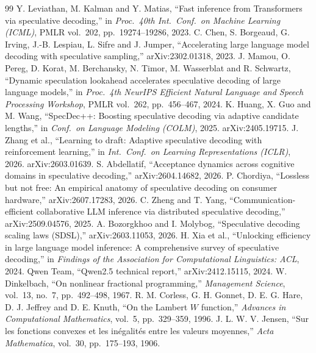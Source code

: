 \documentclass[10pt]{article}
\theoremstyle{remark}
\begin{document}
\small
\begin{thebibliography}{99}\setlength{\itemsep}{1pt}
 Y. Leviathan, M. Kalman and Y. Matias, ``Fast inference from Transformers via speculative
decoding,'' in \emph{Proc.\ 40th Int.\ Conf.\ on Machine Learning (ICML)}, PMLR vol.~202, pp.~19274--19286, 2023.
 C. Chen, S. Borgeaud, G. Irving, J.-B. Lespiau, L. Sifre and J. Jumper, ``Accelerating large
language model decoding with speculative sampling,'' arXiv:2302.01318, 2023.
 J. Mamou, O. Pereg, D. Korat, M. Berchansky, N. Timor, M. Wasserblat and R. Schwartz, ``Dynamic
speculation lookahead accelerates speculative decoding of large language models,'' in \emph{Proc.\ 4th NeurIPS
Efficient Natural Language and Speech Processing Workshop}, PMLR vol.~262, pp.~456--467, 2024.
 K. Huang, X. Guo and M. Wang, ``SpecDec++: Boosting speculative decoding via adaptive
candidate lengths,'' in \emph{Conf.\ on Language Modeling (COLM)}, 2025. arXiv:2405.19715.
 J. Zhang et al., ``Learning to draft: Adaptive speculative decoding with reinforcement
learning,'' in \emph{Int.\ Conf.\ on Learning Representations (ICLR)}, 2026. arXiv:2603.01639.
 S. Abdellatif, ``Acceptance dynamics across cognitive domains in speculative decoding,''
arXiv:2604.14682, 2026.
 P. Chordiya, ``Lossless but not free: An empirical anatomy of speculative decoding on consumer
hardware,'' arXiv:2607.17283, 2026.
 C. Zheng and T. Yang, ``Communication-efficient collaborative LLM inference via distributed
speculative decoding,'' arXiv:2509.04576, 2025.
 A. Bozorgkhoo and I. Molybog, ``Speculative decoding scaling laws (SDSL),'' arXiv:2603.11053, 2026.
 H. Xia et al., ``Unlocking efficiency in large language model inference: A comprehensive
survey of speculative decoding,'' in \emph{Findings of the Association for Computational Linguistics: ACL}, 2024.
 Qwen Team, ``Qwen2.5 technical report,'' arXiv:2412.15115, 2024.
 W. Dinkelbach, ``On nonlinear fractional programming,'' \emph{Management Science}, vol.~13,
no.~7, pp.~492--498, 1967.
 R. M. Corless, G. H. Gonnet, D. E. G. Hare, D. J. Jeffrey and D. E. Knuth, ``On the Lambert $W$
function,'' \emph{Advances in Computational Mathematics}, vol.~5, pp.~329--359, 1996.
 J. L. W. V. Jensen, ``Sur les fonctions convexes et les in\'egalit\'es entre les valeurs
moyennes,'' \emph{Acta Mathematica}, vol.~30, pp.~175--193, 1906.

\end{thebibliography}
\end{document}
